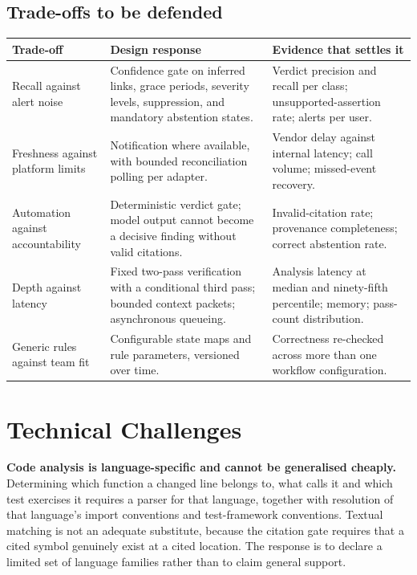 \subsection{Trade-offs to be defended}

\begin{longtable}{>{\raggedright\arraybackslash}p{}>{\raggedright\arraybackslash}p{}>{\raggedright\arraybackslash}p{}}
\toprule
Trade-off & Design response & Evidence that settles it \\
\midrule
\endhead
Recall against alert noise
  & Confidence gate on inferred links, grace periods, severity levels,
    suppression, and mandatory abstention states.
  & Verdict precision and recall per class; unsupported-assertion rate; alerts
    per user. \\
Freshness against platform limits
  & Notification where available, with bounded reconciliation polling per
    adapter.
  & Vendor delay against internal latency; call volume; missed-event recovery. \\
Automation against accountability
  & Deterministic verdict gate; model output cannot become a decisive finding
    without valid citations.
  & Invalid-citation rate; provenance completeness; correct abstention rate. \\
Depth against latency
  & Fixed two-pass verification with a conditional third pass; bounded context
    packets; asynchronous queueing.
  & Analysis latency at median and ninety-fifth percentile; memory; pass-count
    distribution. \\
Generic rules against team fit
  & Configurable state maps and rule parameters, versioned over time.
  & Correctness re-checked across more than one workflow configuration. \\
\bottomrule
\end{longtable}

\section{Technical Challenges}

\textbf{Code analysis is language-specific and cannot be generalised cheaply.}
Determining which function a changed line belongs to, what calls it and which
test exercises it requires a parser for that language, together with resolution
of that language's import conventions and test-framework conventions. Textual
matching is not an adequate substitute, because the citation gate requires that
a cited symbol genuinely exist at a cited location. The response is to declare a
limited set of language families rather than to claim general support.

